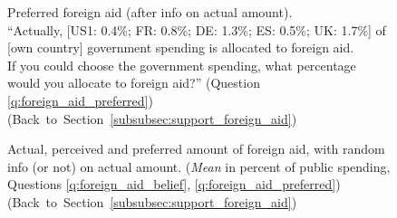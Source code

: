 \begin{figure}[h!]
    \caption[Preferred foreign aid (after info on actual amount)]{Preferred foreign aid (after info on actual amount). \\ ``Actually,
    [US1: 0.4\%; FR: 0.8\%; DE: 1.3\%; ES: 0.5\%; UK: 1.7\%] of [own country] government spending is allocated to foreign aid. \\
    If you could choose the government spending, what percentage would you allocate
    to foreign aid?'' (Question \ref{q:foreign_aid_preferred})  \hfill (Back~to~Section~\ref{subsubsec:support_foreign_aid})}\label{fig:foreign_aid_preferred_info}
\end{figure}

\begin{figure} 
    \caption[Actual, perceived and preferred amount of foreign aid (mean)]{Actual, perceived and preferred amount of foreign aid, with random info (or not) on actual amount. (\textit{Mean} in percent of public spending, Questions \ref{q:foreign_aid_belief}, \ref{q:foreign_aid_preferred})  \hfill (Back~to~Section~\ref{subsubsec:support_foreign_aid})}\label{fig:foreign_aid_amount}
\end{figure}


